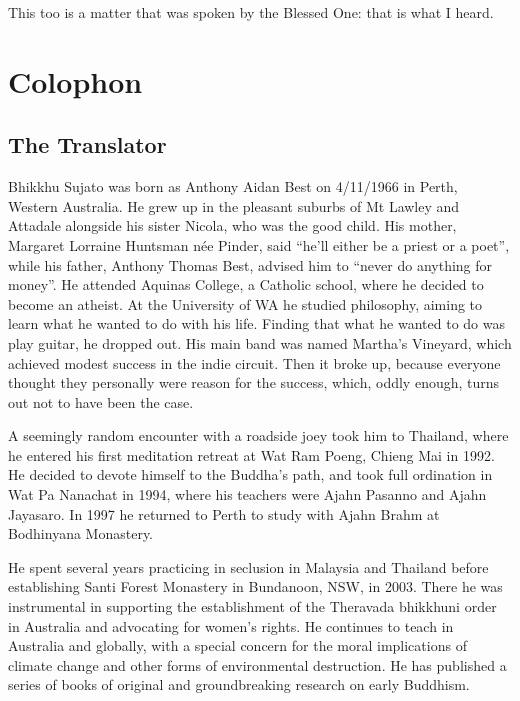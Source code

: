 \documentclass[12pt,openany]{book}%
\let\oldbackmatter\backmatter
\renewcommand{\backmatter}{%
\chapterfont{\setstretch{.85}\normalfont\centering}%
\sectionfont{\setstretch{.85}\Semiboldsubheadfont}%
\oldbackmatter}
\begin{document}
This too is a matter that was spoken by the Blessed One: that is what I heard. 

%
\backmatter%
\chapter*{Colophon}

\section*{The Translator}

Bhikkhu Sujato was born as Anthony Aidan Best on 4/11/1966 in Perth, Western Australia. He grew up in the pleasant suburbs of Mt Lawley and Attadale alongside his sister Nicola, who was the good child. His mother, Margaret Lorraine Huntsman née Pinder, said “he’ll either be a priest or a poet”, while his father, Anthony Thomas Best, advised him to “never do anything for money”. He attended Aquinas College, a Catholic school, where he decided to become an atheist. At the University of WA he studied philosophy, aiming to learn what he wanted to do with his life. Finding that what he wanted to do was play guitar, he dropped out. His main band was named Martha’s Vineyard, which achieved modest success in the indie circuit. Then it broke up, because everyone thought they personally were reason for the success, which, oddly enough, turns out not to have been the case. 

A seemingly random encounter with a roadside joey took him to Thailand, where he entered his first meditation retreat at Wat Ram Poeng, Chieng Mai in 1992. He decided to devote himself to the Buddha’s path, and took full ordination in Wat Pa Nanachat in 1994, where his teachers were Ajahn Pasanno and Ajahn Jayasaro. In 1997 he returned to Perth to study with Ajahn Brahm at Bodhinyana Monastery. 

He spent several years practicing in seclusion in Malaysia and Thailand before establishing Santi Forest Monastery in Bundanoon, NSW, in 2003. There he was instrumental in supporting the establishment of the Theravada bhikkhuni order in Australia and advocating for women’s rights. He continues to teach in Australia and globally, with a special concern for the moral implications of climate change and other forms of environmental destruction. He has published a series of books of original and groundbreaking research on early Buddhism. 
\end{document}
